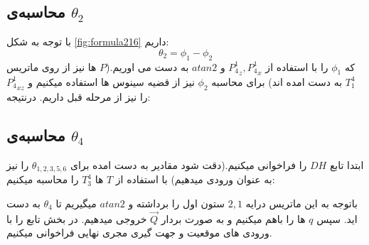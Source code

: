 \documentclass{article}
\begin{document}
\subsection{محاسبه‌ی $\theta_2$}
با توجه به شکل \ref{fig:formula216} داریم:
\begin{equation}
\theta_2 = \phi_1 - \phi_2
\end{equation}
که $\phi_1$ را با استفاده از ${P_4^1}_z, {P_4^1}_x$ و $atan2$ به دست می اوریم.($P$ ها نیز از روی ماتریس $T_1^4$ به دست امده اند)
برای محاسبه $\phi_2$ نیز از قضیه سینوس ها استفاده میکنیم و ${P_4^1}_{xz}$ را نیز از مرحله قبل داریم.
درنتیجه:
\begin{figure}[H]%
	\centering
    \qquad
    \caption{\label{fig:formula221}}
\end{figure}
\noindent
\subsection{محاسبه‌ی $\theta_4$}
ابتدا تابع $DH$ را فراخوانی میکنیم.(دقت شود مقادیر به دست امده برای $\theta_{1,2,3,5,6}$ را نیز به عنوان ورودی میدهیم)
 با استفاده از $T$ ها $T_3^4$ را محاسبه میکنیم:
\begin{figure}[H]%
	\centering
    \caption{\label{fig:formula222}}
\end{figure}
\noindent
باتوجه به این ماتریس درایه $2,1$ ستون اول را برداشته و $atan2$ میگیریم تا $\theta_4$ به دست اید.
سپس $q$ ها را باهم  میکنیم و به صورت بردار $\overrightarrow{Q}$ خروجی میدهیم.
در بخش   تابع  را با ورودی های موقعیت و جهت گیری مجری نهایی فراخوانی میکنیم.
\end{document}
